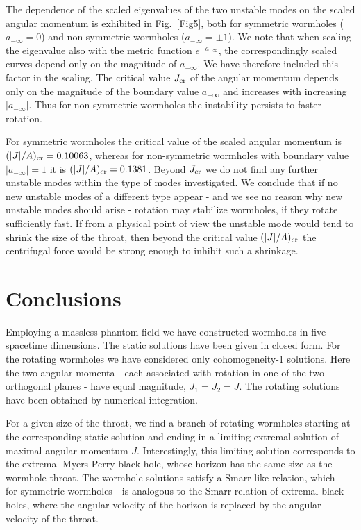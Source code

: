 \documentclass[showpacs,preprintnumbers,amsmath,amssymb,floatfix]{revtex4}
\begin{document}
The dependence of the scaled eigenvalues of the two unstable modes
on the scaled angular momentum is exhibited in Fig.~\ref{Fig5},
both for symmetric wormholes ($a_{-\infty}=0$)
and non-symmetric wormholes ($a_{-\infty}=\pm 1$).
We note that when scaling the eigenvalue also with the metric
function $e^{-a_{-\infty}}$, the correspondingly
scaled curves depend only on the magnitude of $a_{-\infty}$.
We have therefore included this factor in the scaling.
The critical value $J_{\rm cr}$ of the angular momentum 
depends only on the magnitude of the
boundary value $a_{-\infty}$ and increases with increasing
$|a_{-\infty}|$.
Thus for non-symmetric wormholes the instability
persists to faster rotation.

For symmetric wormholes the critical value of the scaled
angular momentum is %
$(|J|/A)_{\rm cr} = 0.10063$,
whereas for non-symmetric wormholes with
boundary value $|a_{-\infty}|=1$ it is
$(|J|/A)_{\rm cr} = 0.1381$.
Beyond $J_{\rm cr}$ we do not find any further
unstable modes within the type of modes investigated.
We conclude that 
if no new unstable modes of a different type appear -
and we see no reason why new unstable modes should arise -
rotation may stabilize wormholes, if they rotate 
sufficiently fast.
If from a physical point of view the unstable mode
would tend to shrink the size of the throat, 
then beyond the critical value $(|J|/A)_{\rm cr}$
the centrifugal force would be strong enough
to inhibit such a shrinkage.




\section{Conclusions}

Employing a massless phantom field
we have constructed wormholes in five spacetime dimensions.
The static solutions have been given in closed form.
For the rotating wormholes we have considered only
cohomogeneity-1 solutions.
Here the two angular momenta - each associated with 
rotation in one of the two orthogonal planes - have equal magnitude,
$J_1=J_2=J$.
The rotating solutions have been obtained by numerical integration.

For a given size of the throat, we find a branch of rotating wormholes
starting at the corresponding static solution and ending in a
limiting extremal solution of maximal angular momentum $J$.
Interestingly, this limiting solution corresponds to
the extremal Myers-Perry black hole,
whose horizon has the same size as the wormhole throat.
The wormhole solutions satisfy a Smarr-like relation, which 
- for symmetric wormholes - is analogous
to the Smarr relation of extremal black holes,
where the angular velocity of the horizon is replaced by the
angular velocity of the throat.
\end{document}
